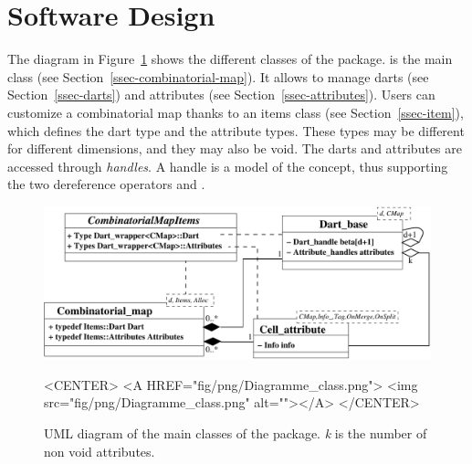 
\section{Software Design}\label{sec-software-design}
The diagram in Figure~\ref{fig-diagram_class} shows the different
classes of the package.   is the main class
(see Section~\ref{ssec-combinatorial-map}). It allows to manage darts
(see Section~\ref{ssec-darts}) and attributes (see
Section~\ref{ssec-attributes}).
Users can customize a combinatorial map thanks to an items class (see
Section~\ref{ssec-item}), which defines the dart type and the
attribute types. These types may be different for different
dimensions, and they may also be void.  The darts and attributes are
accessed through \emph{handles}. A handle is a model of the
 concept, thus supporting the two dereference operators
 and .

\begin{figure}
  \begin{ccTexOnly}
    \begin{center}
      \includegraphics[width=.95\textwidth]
      {Combinatorial_map/fig/pdf/Diagramme_class}
    \end{center}
  \end{ccTexOnly}
  \begin{ccHtmlOnly}
    <CENTER>
    <A HREF="fig/png/Diagramme_class.png">
        <img src="fig/png/Diagramme_class.png" alt=""></A>
    </CENTER>
    \end{ccHtmlOnly}
    \caption{UML diagram of the main classes of the package. \emph{k} is the number of
      non void attributes.}
    \label{fig-diagram_class}
\end{figure}


